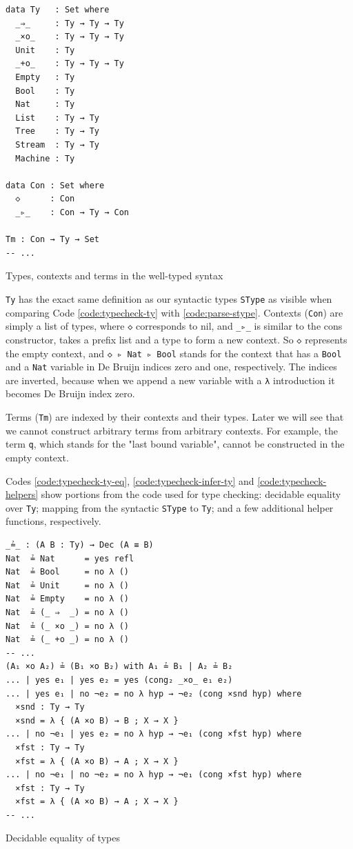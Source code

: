 \begin{listing}[H]
\begin{verbatim}
data Ty   : Set where
  _⇒_     : Ty → Ty → Ty
  _×o_    : Ty → Ty → Ty
  Unit    : Ty
  _+o_    : Ty → Ty → Ty
  Empty   : Ty
  Bool    : Ty
  Nat     : Ty
  List    : Ty → Ty
  Tree    : Ty → Ty
  Stream  : Ty → Ty
  Machine : Ty

data Con : Set where
  ◇      : Con
  _▹_    : Con → Ty → Con

Tm : Con → Ty → Set
-- ...
\end{verbatim}
\caption{Types, contexts and terms in the well-typed syntax}
\label{code:typecheck-ty}
\end{listing}

\verb$Ty$ has the exact same definition as our syntactic types \verb$SType$ as visible when comparing Code \ref{code:typecheck-ty} with \ref{code:parse-stype}. Contexts (\verb$Con$) are simply a list of types, where \verb$◇$ corresponds to nil, and \verb$_▹_$ is similar to the cons constructor, takes a prefix list and a type to form a new context. So \verb$◇$ represents the empty context, and \verb$◇ ▹ Nat ▹ Bool$ stands for the context that has a \verb$Bool$ and a \verb$Nat$ variable in De Bruijn indices zero and one, respectively. The indices are inverted, because when we append a new variable with a \verb$λ$ introduction it becomes De Bruijn index zero.

Terms (\verb$Tm$) are indexed by their contexts and their types. Later we will see that we cannot construct arbitrary terms from arbitrary contexts. For example, the term \verb$q$, which stands for the "last bound variable", cannot be constructed in the empty context.

Codes \ref{code:typecheck-ty-eq}, \ref{code:typecheck-infer-ty} and \ref{code:typecheck-helpers} show portions from the code used for type checking: decidable equality over \verb$Ty$; mapping from the syntactic \verb$SType$ to \verb$Ty$; and a few additional helper functions, respectively.

\begin{listing}[H]
\begin{verbatim}
_≟_ : (A B : Ty) → Dec (A ≡ B)
Nat  ≟ Nat      = yes refl
Nat  ≟ Bool     = no λ ()
Nat  ≟ Unit     = no λ ()
Nat  ≟ Empty    = no λ ()
Nat  ≟ (_ ⇒  _) = no λ ()
Nat  ≟ (_ ×o _) = no λ ()
Nat  ≟ (_ +o _) = no λ ()
-- ...
(A₁ ×o A₂) ≟ (B₁ ×o B₂) with A₁ ≟ B₁ | A₂ ≟ B₂
... | yes e₁ | yes e₂ = yes (cong₂ _×o_ e₁ e₂)
... | yes e₁ | no ¬e₂ = no λ hyp → ¬e₂ (cong ×snd hyp) where
  ×snd : Ty → Ty
  ×snd = λ { (A ×o B) → B ; X → X }
... | no ¬e₁ | yes e₂ = no λ hyp → ¬e₁ (cong ×fst hyp) where
  ×fst : Ty → Ty
  ×fst = λ { (A ×o B) → A ; X → X }
... | no ¬e₁ | no ¬e₂ = no λ hyp → ¬e₁ (cong ×fst hyp) where
  ×fst : Ty → Ty
  ×fst = λ { (A ×o B) → A ; X → X }
-- ...
\end{verbatim}
\caption{Decidable equality of types}
\label{code:typecheck-ty-eq}
\end{listing}

